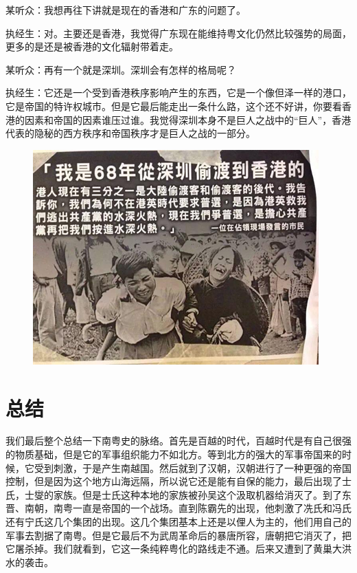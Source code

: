 \begin{quoted}
某听众：我想再往下讲就是现在的香港和广东的问题了。

执经生：对。主要还是香港，我觉得广东现在能维持粤文化仍然比较强势的局面，更多的是还是被香港的文化辐射带着走。

某听众：再有一个就是深圳。深圳会有怎样的格局呢？

执经生：它还是一个受到香港秩序影响产生的东西，它是一个像但泽一样的港口，它是帝国的特许权城市。但是它最后能走出一条什么路，这个还不好讲，你要看香港的因素和帝国的因素谁压过谁。我觉得深圳本身不是巨人之战中的“巨人”，香港代表的隐秘的西方秩序和帝国秩序才是巨人之战的一部分。
\end{quoted}

\begin{figure}
	\centering
	\includegraphics[width=\textwidth]{images/image-81}
\end{figure}

\section{总结}

我们最后整个总结一下南粤史的脉络。首先是百越的时代，百越时代是有自己很强的物质基础，但是它的军事组织能力不如北方。等到北方的强大的军事帝国来的时候，它受到刺激，于是产生南越国。然后就到了汉朝，汉朝进行了一种更强的帝国控制，但是因为这个地方山海远隔，所以说它还是能有自保的能力，最后出现了士氏，士燮的家族。但是士氏这种本地的家族被孙吴这个汲取机器给消灭了。到了东晋、南朝，南粤一直是帝国的一个战场。直到陈霸先的出现，他刺激了冼氏和冯氏还有宁氏这几个集团的出现。这几个集团基本上还是以俚人为主的，他们用自己的军事去割据了南粤。但是它最后不为武周革命后的暴唐所容，唐朝把它消灭了，把它屠杀掉。我们就看到，它这一条纯粹粤化的路线走不通。后来又遭到了黄巢大洪水的袭击。

